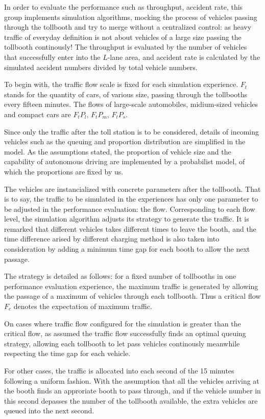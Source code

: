 \documentclass{mcmthesis}
\begin{document}
In order to evaluate the performance such as throughput, accident rate, this group implements simulation algorithms, mocking the process of vehicles passing through the tollbooth and try to merge without a centralized control: as heavy traffic of everyday definition is not about vehicles of a large size passing the tollbooth continously! The throughput is evaluated by the number of vehicles that successfully enter into the $L$-lane area, and accident rate is calculated by the simulated accident numbers divided by total vehicle numbers.

To begin with, the traffic flow scale is fixed for each simulation experience. $F_t$ stands for the quantity of cars, of various size, passing through the tollbooths every fifteen minutes. The flows of large-scale automobiles, midium-sized vehicles and compact cars are $F_tP_l$, $F_tP_m$, $F_tP_s$.

Since only the traffic after the toll station is to be considered, details of incoming vehicles such as the queuing and proportion distribution are simplified in the model. As the assumptions stated, the proportion of vehicle size and the capability of autonomous driving are implemented by a probabilist model, of which the proportions are fixed by us. 

The vehicles are instancialized with concrete parameters after the tollbooth. That is to say, the traffic to be simulated in the experiences has only one parameter to be adjusted in the performance evaluation: the flow. Corresponding to each flow level, the simulation algorithm adjusts its strategy to generate the traffic. It is remarked that different vehicles takes different times to leave the booth, and the time difference arised by different charging method is also taken into consideration by adding a minimum time gap for each booth to allow the next passage.

The strategy is detailed as follows: for a fixed number of tollbooths in one performance evaluation experience, the maximum traffic is generated by allowing the passage of a maximum of vehicles through each tollbooth. Thus a critical flow $F_c$ denotes the expectation of maximum traffic. 

On cases where traffic flow configured for the simulation is greater than the critical flow, as assumed the traffic flow successfully finds an optimal queuing strategy, allowing each tollbooth to let pass vehicles continously meanwhile respecting the time gap for each vehicle. 

For other cases, the traffic is allocated into each second of the 15 minutes following a uniform fashion. With the assumption that all the vehicles arriving at the booth finds an approriate booth to pass through, and if the vehicle number in this second depasses the number of the tollbooth available, the extra vehicles are queued into the next second.
\end{document}
